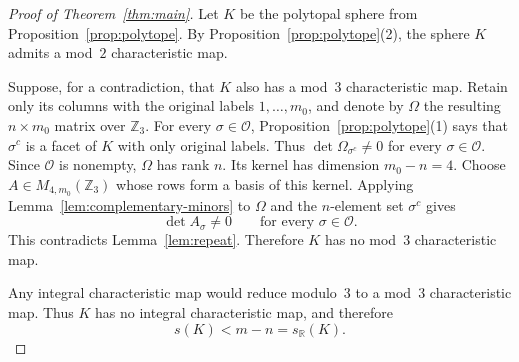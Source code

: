 \documentclass{amsart}
\theoremstyle{plain}
\numberwithin{equation}{section}
\theoremstyle{remark}
\theoremstyle{definition}
\newcommand{\Z}{\mathbb Z}
\newcommand{\cO}{\mathcal O}
\newcommand{\R}{\mathbb R}
\begin{document}
\begin{proof}[Proof of Theorem~\ref{thm:main}]
    Let $K$ be the polytopal sphere from Proposition~\ref{prop:polytope}.
    By Proposition~\ref{prop:polytope}(2), the sphere $K$ admits a mod~$2$ characteristic map.
    
    Suppose, for a contradiction, that $K$ also has a mod~$3$ characteristic map.
    Retain only its columns with the original labels $1,\ldots,m_0$, and denote by $\Omega$ the resulting $n\times m_0$ matrix over $\Z_3$.
    For every $\sigma\in\cO$, Proposition~\ref{prop:polytope}(1) says that $\sigma^c$ is a facet of $K$ with only original labels.
    Thus $\det\Omega_{\sigma^c}\ne0$ for every $\sigma\in\cO$.
    Since $\cO$ is nonempty, $\Omega$ has rank $n$.
    Its kernel has dimension $m_0-n=4$.
    Choose $A\in M_{4,m_0}(\Z_3)$ whose rows form a basis of this kernel.
    Applying Lemma~\ref{lem:complementary-minors} to $\Omega$ and the $n$-element set $\sigma^c$ gives
    $$
        \det A_\sigma\ne0 \qquad\text{for every }\sigma\in\cO.
    $$
    This contradicts Lemma~\ref{lem:repeat}.
    Therefore $K$ has no mod~$3$ characteristic map.
    
    Any integral characteristic map would reduce modulo~$3$ to a mod~$3$ characteristic map.
    Thus $K$ has no integral characteristic map, and therefore
    $$
        s(K)<m-n=s_{\R}(K).
    $$
\end{proof}
\end{document}
